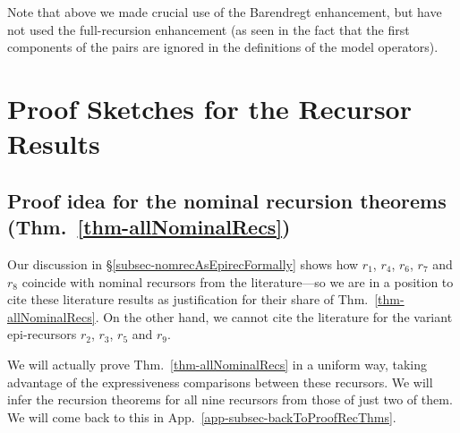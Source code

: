 Note that above we made crucial use of the Barendregt enhancement, but have not used 
the full-recursion enhancement (as seen in the fact that the first components of the pairs 
are ignored in the definitions of the model operators).

%



\section{Proof Sketches for the Recursor Results}
\label{app-proofSketches} 

\subsection{Proof idea for the nominal recursion theorems (Thm.~\ref{thm-allNominalRecs})}
\label{app-subsec-proofIdeaRecursionThm}

Our discussion in \S\ref{subsec-nomrecAsEpirecFormally} 
shows how %
$r_1$, $r_4$, $r_6$, $r_7$ and $r_8$ coincide with nominal recursors 
from the literature---so we are in a position to cite these literature results as justification for their share of Thm.~\ref{thm-allNominalRecs}. On the other hand, we cannot cite the literature for the variant epi-recursors $r_2$, $r_3$, $r_5$ and $r_9$. 
%

We will actually prove Thm.~\ref{thm-allNominalRecs} in a uniform way, 
taking advantage of the expressiveness comparisons between these recursors. We will infer the recursion theorems for all nine recursors from those of just two of them. 
We will come back to this in  App.~\ref{app-subsec-backToProofRecThms}.   


